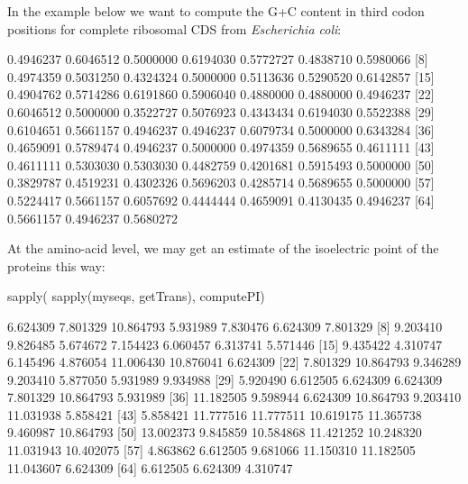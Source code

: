 \documentclass{article}
\begin{document}
In the example below we want to compute the G+C content in third codon
positions for complete ribosomal CDS from \textit{Escherichia coli}:

\begin{Schunk}
\begin{Soutput}
 [1] 0.4946237 0.6046512 0.5000000 0.6194030 0.5772727 0.4838710 0.5980066
 [8] 0.4974359 0.5031250 0.4324324 0.5000000 0.5113636 0.5290520 0.6142857
[15] 0.4904762 0.5714286 0.6191860 0.5906040 0.4880000 0.4880000 0.4946237
[22] 0.6046512 0.5000000 0.3522727 0.5076923 0.4343434 0.6194030 0.5522388
[29] 0.6104651 0.5661157 0.4946237 0.4946237 0.6079734 0.5000000 0.6343284
[36] 0.4659091 0.5789474 0.4946237 0.5000000 0.4974359 0.5689655 0.4611111
[43] 0.4611111 0.5303030 0.5303030 0.4482759 0.4201681 0.5915493 0.5000000
[50] 0.3829787 0.4519231 0.4302326 0.5696203 0.4285714 0.5689655 0.5000000
[57] 0.5224417 0.5661157 0.6057692 0.4444444 0.4659091 0.4130435 0.4946237
[64] 0.5661157 0.4946237 0.5680272
\end{Soutput}
\end{Schunk}

At the amino-acid level, we may get an estimate of the isoelectric point of
the proteins this way:

\begin{Schunk}
\begin{Sinput}
 sapply( sapply(myseqs, getTrans), computePI)
\end{Sinput}
\begin{Soutput}
 [1]  6.624309  7.801329 10.864793  5.931989  7.830476  6.624309  7.801329
 [8]  9.203410  9.826485  5.674672  7.154423  6.060457  6.313741  5.571446
[15]  9.435422  4.310747  6.145496  4.876054 11.006430 10.876041  6.624309
[22]  7.801329 10.864793  9.346289  9.203410  5.877050  5.931989  9.934988
[29]  5.920490  6.612505  6.624309  6.624309  7.801329 10.864793  5.931989
[36] 11.182505  9.598944  6.624309 10.864793  9.203410 11.031938  5.858421
[43]  5.858421 11.777516 11.777511 10.619175 11.365738  9.460987 10.864793
[50] 13.002373  9.845859 10.584868 11.421252 10.248320 11.031943 10.402075
[57]  4.863862  6.612505  9.681066 11.150310 11.182505 11.043607  6.624309
[64]  6.612505  6.624309  4.310747
\end{Soutput}
\end{Schunk}
\end{document}

